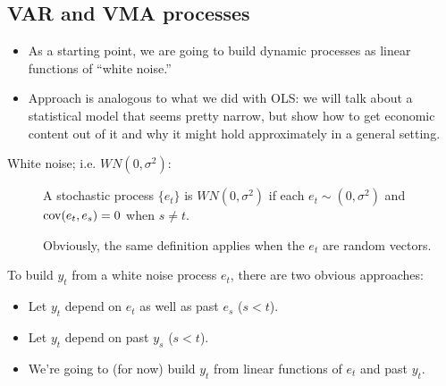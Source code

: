 \subsection{VAR and VMA processes}

\begin{itemize}
\item As a starting point, we are going to build dynamic processes as
  linear functions of ``white noise.''
\item Approach is analogous to what we did with OLS: we will talk
  about a statistical model that seems pretty narrow, but show how to
  get economic content out of it and why it might hold approximately
  in a general setting.
\end{itemize}

\begin{description}
\item[White noise; i.e. $WN(0,\sigma^2)$:]
  A stochastic process $\{e_t\}$ is $WN(0, \sigma^2)$ if each $e_t ∼ (0,
  \sigma^2)$ and $\operatorname{cov}(e_t, e_s) = 0$ when $s \neq t$.

  Obviously, the same definition applies when the $e_t$ are random
  vectors.
\end{description}

To build $y_t$ from a white noise process $e_t$, there are two obvious
approaches:
\begin{itemize}
\item Let $y_t$ depend on $e_t$ as well as past $e_s$ ($s < t$).
\item Let $y_t$ depend on past $y_s$ ($s < t$).
\item We're going to (for now) build $y_t$ from linear functions of
  $e_t$ and past $y_t$.
\end{itemize}

